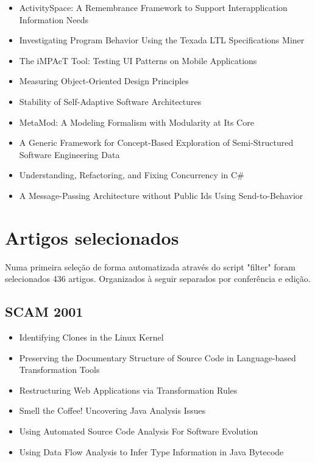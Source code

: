 {\begin{itemize}[itemsep=-1ex]
  \item ActivitySpace: A Remembrance Framework to Support Interapplication Information Needs
  \item Investigating Program Behavior Using the Texada LTL Specifications Miner
  \item The iMPAcT Tool: Testing UI Patterns on Mobile Applications
  \item Measuring Object-Oriented Design Principles
  \item Stability of Self-Adaptive Software Architectures
  \item MetaMod: A Modeling Formalism with Modularity at Its Core
  \item A Generic Framework for Concept-Based Exploration of Semi-Structured Software Engineering Data
  \item Understanding, Refactoring, and Fixing Concurrency in C\#
  \item A Message-Passing Architecture without Public Ids Using Send-to-Behavior
\end{itemize}
}

\section{Artigos selecionados} \label{artigos-selecionados-filter}

Numa primeira seleção de forma automatizada através do script "filter" foram
selecionados 436 artigos. Organizados à seguir separados por conferência e
edição.

\subsection{SCAM 2001}

{\small
\begin{itemize}[itemsep=-1ex]
  \item Identifying Clones in the Linux Kernel \checkmark
  \item Preserving the Documentary Structure of Source Code in Language-based Transformation Tools \checkmark \checkmark
  \item Restructuring Web Applications via Transformation Rules \checkmark \checkmark
  \item Smell the Coffee! Uncovering Java Analysis Issues
  \item Using Automated Source Code Analysis For Software Evolution
  \item Using Data Flow Analysis to Infer Type Information in Java Bytecode \checkmark
\end{itemize}
}

